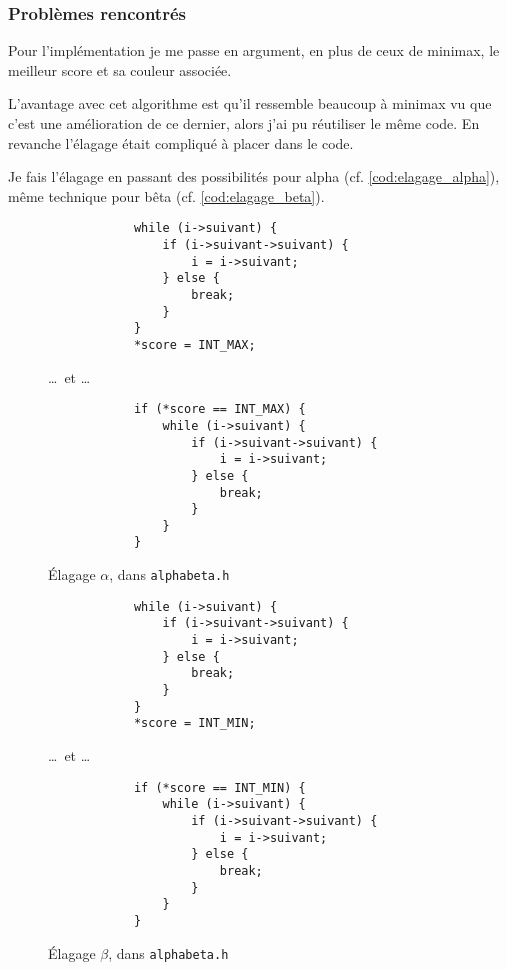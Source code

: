\documentclass{article}
\begin{document}
\subsubsection{Problèmes rencontrés}
Pour l'implémentation je me passe en argument, en plus de ceux de minimax, le
meilleur score et sa couleur associée.

L'avantage avec cet algorithme est qu'il ressemble beaucoup à minimax vu que c'est
une amélioration de ce dernier, alors j'ai pu réutiliser le même code. En revanche
l'élagage était compliqué à placer dans le code.

Je fais l'élagage en passant des possibilités pour alpha (cf. \autoref{cod:elagage_alpha}),
même technique pour bêta (cf. \autoref{cod:elagage_beta}).

\begin{figure}[h]
    \centering
    \begin{minipage}{0.8\textwidth}
        \begin{verbatim}
            while (i->suivant) {
                if (i->suivant->suivant) {
                    i = i->suivant;
                } else {
                    break;
                }
            }
            *score = INT_MAX;
        \end{verbatim}
        \dots\, et \dots
        \begin{verbatim}
            if (*score == INT_MAX) {
                while (i->suivant) {
                    if (i->suivant->suivant) {
                        i = i->suivant;
                    } else {
                        break;
                    }
                }
            }
        \end{verbatim}
    \end{minipage}
    \caption{Élagage $\alpha$, dans \texttt{alphabeta.h}}
    \label{cod:elagage_alpha}
\end{figure}

\begin{figure}[h]
    \centering
    \begin{minipage}{0.8\textwidth}
        \begin{verbatim}
            while (i->suivant) {
                if (i->suivant->suivant) {
                    i = i->suivant;
                } else {
                    break;
                }
            }
            *score = INT_MIN;
        \end{verbatim}
        \dots\, et \dots
        \begin{verbatim}
            if (*score == INT_MIN) {
                while (i->suivant) {
                    if (i->suivant->suivant) {
                        i = i->suivant;
                    } else {
                        break;
                    }
                }
            }
        \end{verbatim}
    \end{minipage}
    \caption{Élagage $\beta$, dans \texttt{alphabeta.h}}
    \label{cod:elagage_beta}
\end{figure}
\end{document}
